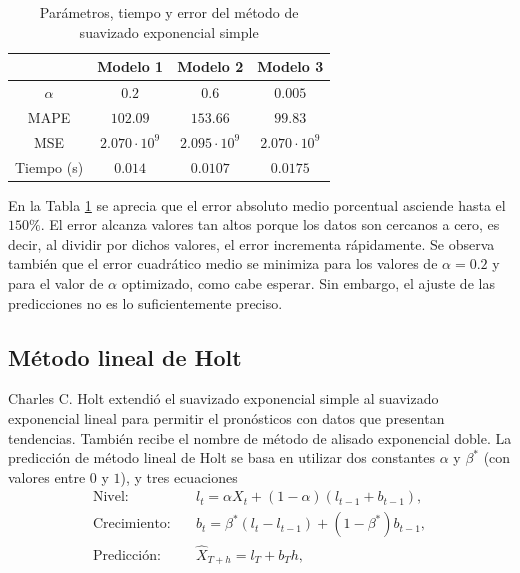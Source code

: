 \documentclass[12pt,twoside]{article}
\begin{document}
\begin{table}[h] 
\centering
\begin{tabular}{cccc} \hline
     & Modelo 1 & Modelo 2 & Modelo 3  \\ \hline
    $\alpha$ &  $0.2$ &   $0.6$ &   $0.005$ \\ 
      MAPE & $102.09$	 &   $153.66$ &  $99.83$ \\
      MSE  & $2.070\cdot10 ^{9}$ & $2.095\cdot10^{9}$ & $2.070\cdot10^{9}$ \\
      Tiempo (s) & $0.014$ &   $0.0107$ &  $0.0175$ \\ \hline
\end{tabular}
\caption{Parámetros, tiempo y error del método de suavizado exponencial simple} \label{tab:simple_exp}
\end{table}


En la Tabla \ref{tab:simple_exp} se aprecia que el error absoluto medio porcentual asciende hasta el $150\%$. El error alcanza valores tan altos porque los datos son cercanos a cero, es decir, al dividir por dichos valores, el error incrementa rápidamente. Se observa también que el error cuadrático medio se minimiza para los valores de $\alpha=0.2$ y para el valor de $\alpha$ optimizado, como cabe esperar. Sin embargo, el ajuste de las predicciones no es lo suficientemente preciso.



\subsection{Método lineal de Holt}
Charles C. Holt \cite{ES2} extendió el suavizado exponencial simple al suavizado exponencial lineal para permitir el pronósticos con datos que presentan tendencias. También recibe el nombre de método de alisado exponencial doble. La predicción de método lineal de Holt se basa en utilizar dos constantes $\alpha$ y $\beta^*$ (con valores entre $0$ y $1$), y tres ecuaciones
\begin{align}
    \text{Nivel:} \quad& l_t = \alpha X_t + (1-\alpha)(l_{t-1} + b_{t-1}),\label{eq:Holt:nivel}\\
    \text{Crecimiento:} \quad& b_t = \beta^*(l_t - l_{t-1}) + (1-\beta^*)b_{t-1},\label{eq:Holt:crec}\\
    \text{Predicción:} \quad& \hat{X}_{T+h} = l_T + b_Th,\label{eq:Holt:pred}
\end{align}
\end{document}
